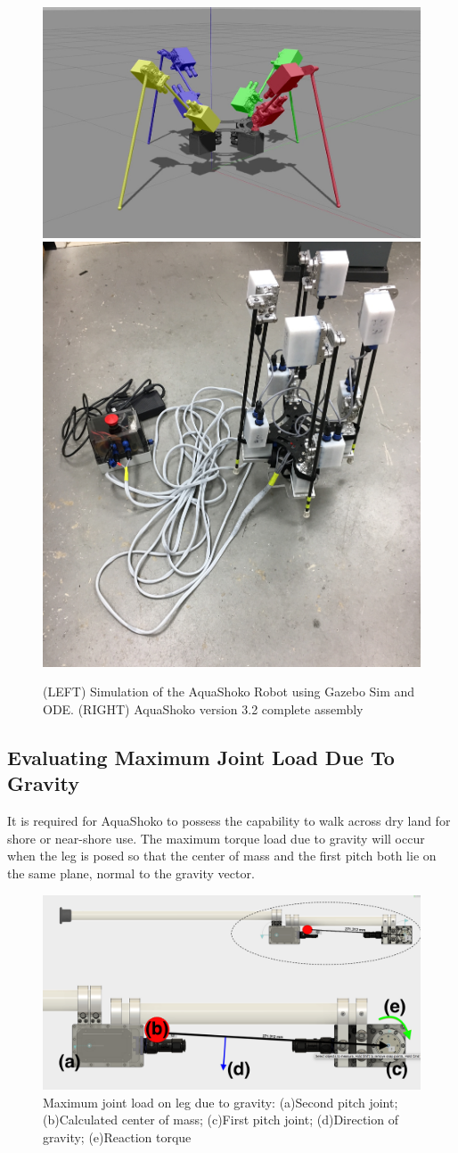 \begin{figure}[!t]
\centering
\includegraphics[width=0.65\columnwidth]{./img/AquaShoko-Sim-c.jpg}\includegraphics[width=0.35\columnwidth]{./img/aquaShoko-v3dot2-photo-complete.JPG}
\caption{(LEFT) Simulation of the AquaShoko Robot using Gazebo Sim and ODE. (RIGHT) AquaShoko version 3.2 complete assembly}
\label{fig:gazebo}\label{fig:shoko 3dot2}
\end{figure}







\subsection{Evaluating Maximum Joint Load Due To Gravity}
It is required for AquaShoko to possess the capability to walk across dry land for shore or near-shore use. The maximum torque load due to gravity will occur when the leg is posed so that the center of mass and the first pitch both lie on the same plane, normal to the gravity vector. 

\begin{figure}[h]
\centering
\includegraphics[width=1.0\columnwidth]{./img/aquaShoko-v3dot3-legCOM.png}
\caption{Maximum joint load on leg due to gravity: (a)Second pitch joint; (b)Calculated center of mass; (c)First pitch joint; (d)Direction of gravity; (e)Reaction torque}
\label{fig:shoko 3dot2-2}
\end{figure}



